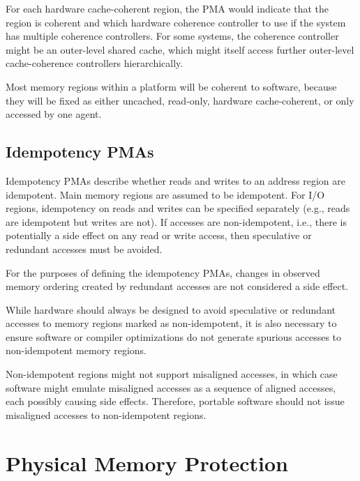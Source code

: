 \begin{commentary}
For each hardware cache-coherent region, the PMA would indicate that
the region is coherent and which hardware coherence controller to use
if the system has multiple coherence controllers.  For some systems,
the coherence controller might be an outer-level shared cache, which
might itself access further outer-level cache-coherence controllers
hierarchically.

Most memory regions within a platform will be coherent to software,
because they will be fixed as either uncached, read-only, hardware
cache-coherent, or only accessed by one agent.
\end{commentary}

\subsection{Idempotency PMAs}

Idempotency PMAs describe whether reads and writes to an address
region are idempotent.  Main memory regions are assumed to be
idempotent.  For I/O regions, idempotency on reads and writes can be
specified separately (e.g., reads are idempotent but writes are not).
If accesses are non-idempotent, i.e., there is potentially a side
effect on any read or write access, then speculative or redundant
accesses must be avoided.

For the purposes of defining the idempotency PMAs, changes in observed
memory ordering created by redundant accesses are not considered a
side effect.

\begin{commentary}
While hardware should always be designed to avoid speculative or
redundant accesses to memory regions marked as non-idempotent, it is
also necessary to ensure software or compiler optimizations do not
generate spurious accesses to non-idempotent memory regions.
\end{commentary}

\begin{commentary}
Non-idempotent regions might not support misaligned accesses, in which case
software might emulate misaligned accesses as a sequence of aligned accesses,
each possibly causing side effects.  Therefore, portable software should not
issue misaligned accesses to non-idempotent regions.
\end{commentary}

\section{Physical Memory Protection}
\label{sec:pmp}

